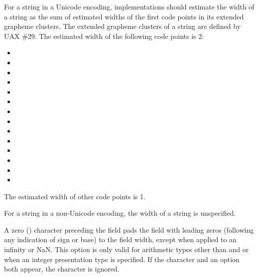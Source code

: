 \pnum
For a string in a Unicode encoding,
implementations should estimate the width of a string
as the sum of estimated widths of
the first code points in its extended grapheme clusters.
The extended grapheme clusters of a string are defined by UAX \#29.
The estimated width of the following code points is 2:
\begin{itemize}
\item {}
\item {}
\item {}
\item {}
\item {}
\item {}
\item {}
\item {}
\item {}
\item {}
\item {}
\item {}
\item {}
\item {}
\end{itemize}
The estimated width of other code points is 1.

\pnum
For a string in a non-Unicode encoding, the width of a string is unspecified.

\pnum
A zero () character
preceding the  field
pads the field with leading zeros (following any indication of sign or base)
to the field width,
except when applied to an infinity or NaN.
This option is only valid for
arithmetic types other than  and 
or when an integer presentation type is specified.
If the  character and an  option both appear,
the  character is ignored.
\begin{example}
\end{example}

